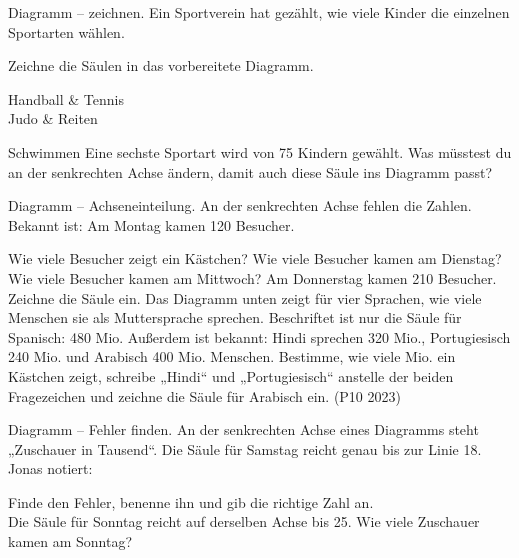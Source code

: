 \begin{aufgabe}{Diagramm -- zeichnen. Ein Sportverein hat gezählt, wie viele Kinder die einzelnen Sportarten wählen.}

Zeichne die Säulen in das vorbereitete Diagramm.

\noindent{}

\begin{teilezwei}
\tz Handball & \tz Tennis \\
\tz Judo & \tz Reiten \\
\end{teilezwei}
\begin{teile}
\teil Schwimmen
\teil Eine sechste Sportart wird von 75 Kindern gewählt. Was müsstest du an der senkrechten Achse ändern, damit auch diese Säule ins Diagramm passt? \\[10pt]
\end{teile}
\end{aufgabe}

\begin{aufgabe}{Diagramm -- Achseneinteilung. An der senkrechten Achse fehlen die Zahlen. Bekannt ist: Am Montag kamen 120 Besucher.}
\noindent{}

\begin{teile}
\teil Wie viele Besucher zeigt ein Kästchen? \leerfeld
\teil Wie viele Besucher kamen am Dienstag? \leerfeld
\teil Wie viele Besucher kamen am Mittwoch? \leerfeld
\teil Am Donnerstag kamen 210 Besucher. Zeichne die Säule ein.
\teil Das Diagramm unten zeigt für vier Sprachen, wie viele Menschen sie als Muttersprache sprechen. Beschriftet ist nur die Säule für Spanisch: 480 Mio. Außerdem ist bekannt: Hindi sprechen 320 Mio., Portugiesisch 240 Mio. und Arabisch 400 Mio. Menschen. Bestimme, wie viele Mio. ein Kästchen zeigt, schreibe „Hindi“ und „Portugiesisch“ anstelle der beiden Fragezeichen und zeichne die Säule für Arabisch ein. (P10 2023)
\end{teile}

\noindent{}
\end{aufgabe}

\begin{aufgabe}{Diagramm -- Fehler finden.}
An der senkrechten Achse eines Diagramms steht „Zuschauer in Tausend“. Die Säule für Samstag reicht genau bis zur Linie 18. Jonas notiert:
\begin{teile}
\teil Finde den Fehler, benenne ihn und gib die richtige Zahl an. \\[10pt]
\teil Die Säule für Sonntag reicht auf derselben Achse bis 25. Wie viele Zuschauer kamen am Sonntag? \leerfeld
\end{teile}
\end{aufgabe}

